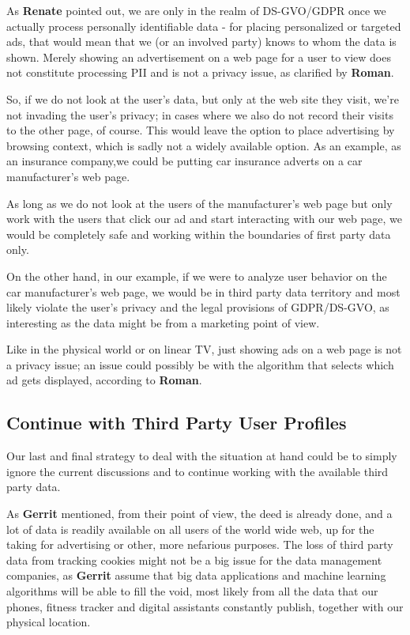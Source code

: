 As \textbf{Renate} pointed out, we are only in the realm of DS-GVO/GDPR once we actually process personally identifiable data - for placing personalized or targeted ads, that would mean that we (or an involved party) knows to whom the data is shown. Merely showing an advertisement on a web page for a user to view does not constitute processing PII and is not a privacy issue, as clarified by \textbf{Roman}.

So, if we do not look at the user's data, but only at the web site they visit, we're not invading the user's privacy; in cases where we also do not record their visits to the other page, of course. This would leave the option to place advertising by browsing context, which is sadly not a widely available option. As an example, as an insurance company,we could be putting car insurance adverts on a car manufacturer's web page. 

As long as we do not look at the users of the manufacturer's web page but only work with the users that click our ad and start interacting with our web page, we would be completely safe and working within the boundaries of first party data only.

On the other hand, in our example, if we were to analyze user behavior on the car manufacturer's web page, we would be in third party data territory and most likely violate the user's privacy and the legal provisions of GDPR/DS-GVO, as interesting as the data might be from a marketing point of view.

Like in the physical world or on linear TV, just showing ads on a web page is not a privacy issue; an issue could possibly be with the algorithm that selects which ad gets displayed, according to \textbf{Roman}.

\subsection{Continue with Third Party User Profiles}

Our last and final strategy to deal with the situation at hand could be to simply ignore the current discussions and to continue working with the available third party data.

As \textbf{Gerrit} mentioned, from their point of view, the deed is already done, and a lot of data is readily available on all users of the world wide web, up for the taking for advertising or other, more nefarious purposes. The loss of third party data from tracking cookies might not be a big issue for the data management companies, as \textbf{Gerrit} assume that big data applications and machine learning algorithms will be able to fill the void, most likely from all the data that our phones, fitness tracker and digital assistants constantly publish, together with our physical location.

